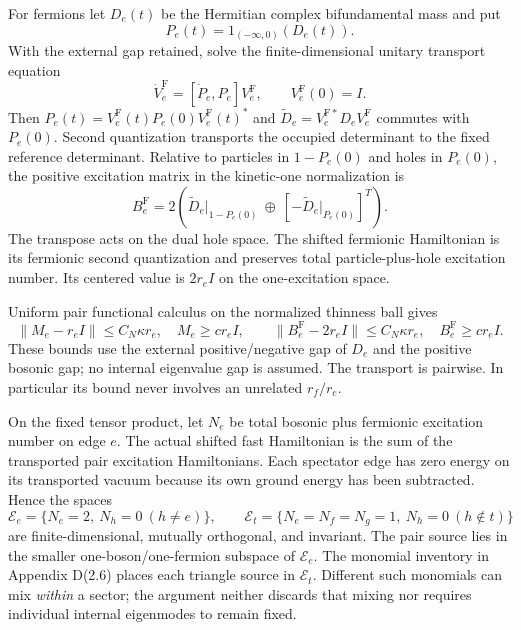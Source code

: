 For fermions let $D_e(t)$ be the Hermitian complex bifundamental mass
and put
\[P_e(t)=1_{(-\infty,0)}(D_e(t)).\]
With the external gap retained,
solve the finite-dimensional unitary transport equation
\[
 \dot V_e^{\mathrm F}=[\dot P_e,P_e]V_e^{\mathrm F},\qquad
 V_e^{\mathrm F}(0)=I.
 \tag{A8}\label{auditadd:kato}
\]
Then $P_e(t)=V_e^{\mathrm F}(t)P_e(0)V_e^{\mathrm F}(t)^*$ and
$\widetilde D_e=V_e^{\mathrm F*}D_eV_e^{\mathrm F}$ commutes with
$P_e(0)$. Second quantization transports the occupied determinant to
the fixed reference determinant. Relative to particles in
$1-P_e(0)$ and holes in $P_e(0)$, the positive excitation matrix in the
kinetic-one normalization is
\[
 B_e^{\mathrm F}=2\left(
 \widetilde D_e\big|_{1-P_e(0)}\ \oplus\
 [-\widetilde D_e\big|_{P_e(0)}]^T\right).
 \tag{A9}\label{auditadd:fermion-transport}
\]
The transpose acts on the dual hole space. The shifted fermionic
Hamiltonian is its fermionic second quantization and preserves total
particle-plus-hole excitation number. Its centered value is $2r_eI$
on the one-excitation space.

Uniform pair functional calculus on the normalized thinness ball gives
\[
 \|M_e-r_eI\|\le C_N\kappa r_e,\quad M_e\ge c r_eI,
 \qquad
 \|B_e^{\mathrm F}-2r_eI\|\le C_N\kappa r_e,\quad
 B_e^{\mathrm F}\ge c r_eI.
 \tag{A10}\label{auditadd:pair-matrices}
\]
These bounds use the external positive/negative gap of $D_e$ and the
positive bosonic gap; no internal eigenvalue gap is assumed. The
transport is pairwise. In particular its bound never involves an
unrelated $r_f/r_e$.

On the fixed tensor product, let $N_e$ be total bosonic plus fermionic
excitation number on edge $e$. The actual shifted fast Hamiltonian is
the sum of the transported pair excitation Hamiltonians. Each
spectator edge has zero energy on its transported vacuum because its
own ground energy has been subtracted. Hence the spaces
\[
 \mathcal E_e=\{N_e=2,\ N_h=0\ (h\ne e)\},\qquad
 \mathcal E_t=\{N_e=N_f=N_g=1,\ N_h=0\ (h\notin t)\}
\]
are finite-dimensional, mutually orthogonal, and invariant. The pair
source lies in the smaller one-boson/one-fermion subspace of
$\mathcal E_e$. The monomial inventory in Appendix D(2.6) places each
triangle source in $\mathcal E_t$. Different such monomials can mix
\emph{within} a sector; the argument neither discards that mixing nor
requires individual internal eigenmodes to remain fixed.

